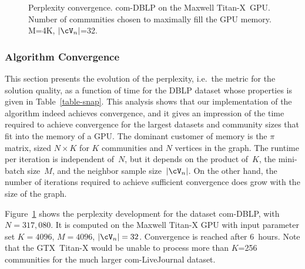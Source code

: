 
\begin{comment}
\begin{figure}[tb]	%
  \centering
  \epsfig{file=plots/ppx-gpu.eps, width=\columnwidth}
  \caption{Perplexity convergence of com-DBLP on the Maxwell \mbox{Titan-X}~GPU. Number
  of communities chosen to maximally fill the GPU memory.}
  \label{fig-ppx-gpu}
\end{figure}

\begin{figure}[tb]	%
  \centering
  \epsfig{file=plots/ppx-cpu.eps, width=\columnwidth}
  \caption{Perplexity convergence of com-LiveJournal on the multi-core~CPU.
  Number of communities chosen to maximally fill the CPU memory.}
  \label{fig-ppx-cpu}
\end{figure}
\end{comment}

\begin{figure}[tb]	%
  \centering
  \caption{Perplexity convergence. com-DBLP on the Maxwell \mbox{Titan-X}~GPU.
  Number of communities chosen to
  maximally fill the GPU memory.
  M=4K, $|\Neighbors|$=32.}
  \label{fig-ppx-gpu-cpu}
\end{figure}

\subsubsection{Algorithm Convergence}

This section presents the evolution of the perplexity, i.e.\ the metric for
the solution quality, as a function of time for
the DBLP dataset whose properties is given in Table~\ref{table-snap}. This
analysis shows that our implementation of the algorithm indeed achieves
convergence, and it gives an impression of the time required to achieve
convergence for the largest datasets and community sizes that fit into the memory
of a GPU. The dominant customer of memory is the
$\pi$ matrix, sized $N{\times}K$ for $K$ communities and $N$ vertices in the
graph. The runtime per iteration is independent of~$N$, but it depends on the
product of~$K$, the mini-batch size~$M$, and the neighbor sample size~$|\Neighbors|$. On
the other hand, the number of iterations required to achieve sufficient
convergence does grow with the size of the graph.

Figure~\ref{fig-ppx-gpu-cpu} shows the perplexity development for the dataset
com-DBLP, with $N=317,080$. It is computed on the Maxwell \mbox{Titan-X} GPU with input
parameter set $K=4096$, $M=4096$, $|\Neighbors|=32$. Convergence is reached after 6~hours.
%
Note that the GTX~\mbox{Titan-X} would be unable to
process more than $K$=256 communities for the much larger com-LiveJournal dataset.
